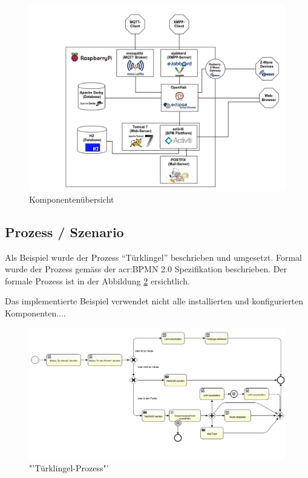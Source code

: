\begin{landscape}
\begin{figure}[H]
  \centering
  \includegraphics[width=19cm]{./images/Component-Overview}
  \caption{Komponentenübersicht}\label{img:AnalyseRpi:ComponentOverview}
\end{figure}
\end{landscape}

\subsection{Prozess / Szenario}
Als Beispiel wurde der Prozess "`Türklingel"' beschrieben und umgesetzt. Formal wurde der Prozess gemäss der \gls{acr:BPMN} 2.0 Spezifikation beschrieben. Der formale Prozess ist in der Abbildung \ref{img:AnalyseRpi:DoorbellProcess}  ersichtlich.

Das implementierte Beispiel verwendet nicht alle installierten und konfigurierten Komponenten....


\newpage
\begin{landscape}
\begin{figure}[H]
  \centering
  \includegraphics[width=21cm]{./images/DoorBellProcess}
  \caption{"'Türklingel-Prozess"'}\label{img:AnalyseRpi:DoorbellProcess}
\end{figure}
\end{landscape}
